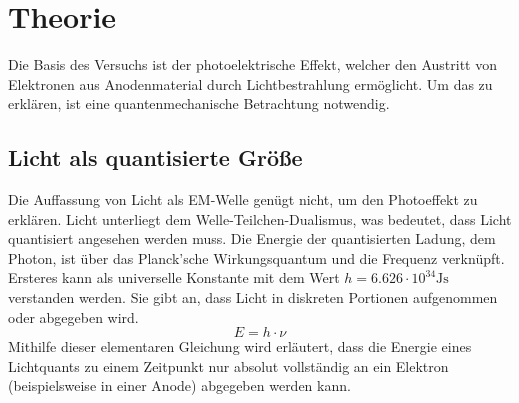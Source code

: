 \section{Theorie}
\label{sec:Theorie}

Die Basis des Versuchs ist der photoelektrische Effekt, welcher den Austritt 
von Elektronen aus Anodenmaterial durch Lichtbestrahlung ermöglicht. Um das 
zu erklären, ist eine quantenmechanische Betrachtung notwendig.

\subsection{Licht als quantisierte Größe}
Die Auffassung von Licht als EM-Welle genügt nicht, um den Photoeffekt zu
erklären. Licht unterliegt dem Welle-Teilchen-Dualismus, was bedeutet, dass 
Licht quantisiert angesehen werden muss. Die Energie der quantisierten Ladung, 
dem Photon, ist über das Planck'sche Wirkungsquantum und die Frequenz verknüpft. 
Ersteres kann als universelle Konstante mit dem Wert $h = 6.626 \cdot 10^{34} \unit{\joule\second}$
verstanden werden. Sie gibt an, dass Licht in diskreten Portionen aufgenommen 
oder abgegeben wird.
\begin{equation}
    \label{eqn:1}
    E = h \cdot \nu
\end{equation}
Mithilfe dieser elementaren Gleichung wird erläutert, dass die Energie eines 
Lichtquants zu einem Zeitpunkt nur absolut vollständig an ein Elektron (beispielsweise 
in einer Anode) abgegeben werden kann.

